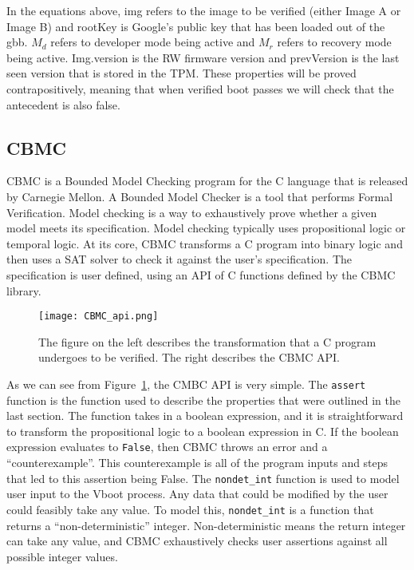 \documentclass[../report.tex]{subfiles}
\def\code#1{\texttt{#1}}
\begin{document}


In the equations above, img refers to the image to be verified (either Image A or Image B)  and rootKey is Google's public key that has been loaded out of the gbb.
$M_d$ refers to developer mode being active and $M_r$ refers to recovery mode being active.
Img.version is the RW firmware version and prevVersion is the last seen version that is stored in the TPM\@.
These properties will be proved contrapositively, meaning that when verified boot passes we will check that the antecedent is also false.


\subsection{CBMC}

CBMC is a Bounded Model Checking program for the C language that is released by
Carnegie Mellon. 
A Bounded Model Checker is a tool that performs Formal Verification.
Model checking is a way to exhaustively prove whether a given model meets its
specification.
Model checking typically uses propositional logic or temporal logic. 
At its core, CBMC transforms a C program into binary logic and
then uses a SAT solver to check it against the user's specification. 
The specification is user defined, using an API of C functions defined by the
CBMC library. 

\begin{figure}
  \centering
  \texttt{[image: CBMC\_api.png]}
  \caption{The figure on the left describes the transformation that a C
  program undergoes to be verified. The right describes the CBMC API.}\label{fig:CBMC_api}
\end{figure}

As we can see from Figure~\ref{fig:CBMC_api}, the CMBC API is very simple.
The \code{assert} function is the function used to describe the properties that
were outlined in the last section. 
The function takes in a boolean expression, and it is straightforward to
transform the propositional logic to a boolean expression in C.
If the boolean expression evaluates to \code{False}, then CBMC throws an error
and a ``counterexample''.
This counterexample is all of the program inputs and steps that led to this
assertion being False.
The \code{nondet\_int} function is used to model user input to the Vboot process.
Any data that could be modified by the user could feasibly take any
value.
To model this, \code{nondet\_int} is a function that returns a
``non-deterministic'' integer. 
Non-deterministic means the return integer can take any value, and CBMC
exhaustively checks user assertions against all possible integer values.
\end{document}
